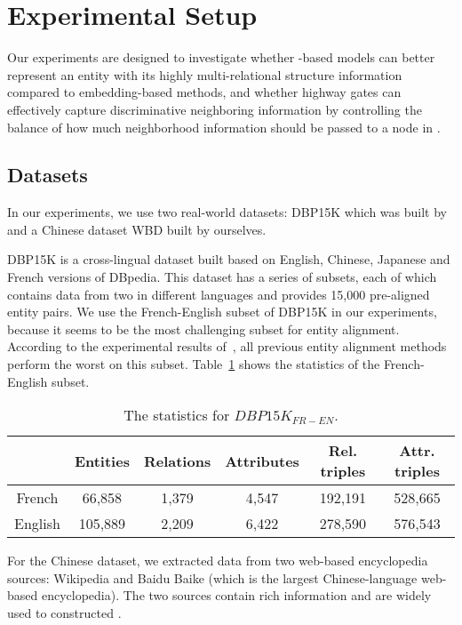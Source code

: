 \section{Experimental Setup}
	Our experiments are designed to investigate whether \RGCN-based models can better represent an entity with its highly multi-relational
structure information compared to \KG embedding-based methods, and whether highway gates can effectively capture discriminative neighboring
information by controlling the balance of how much neighborhood information should be passed to a node in \RGCN.

\subsection{Datasets}
\label{subsection:datasets}
	In our experiments, we use two real-world datasets: DBP15K which was built by~\cite{sun2017cross} and a Chinese dataset WBD built by ourselves. 
	
	DBP15K is a cross-lingual dataset built based on English, Chinese, Japanese and French versions of DBpedia. 
	This dataset has a series of subsets, each of which contains data from two \KGs in different languages and provides 15,000 pre-aligned entity pairs. 
	We use the French-English subset of DBP15K in our experiments, because it seems to be the most challenging subset for entity alignment. 
	According to the experimental results of~\cite{sun2017cross}, all previous entity alignment methods perform the worst on this subset. Table~\ref{dbp} shows the statistics of the French-English subset.
	
		\begin{table}
		\centering
		\scriptsize
		\begin{tabular}{c|ccccc}
			\toprule
			&\bf  Entities &\bf  Relations &\bf  Attributes &\bf  Rel. triples &\bf  Attr. triples \\
			\midrule
			French & 66,858 & 1,379 & 4,547 & 192,191 & 528,665 \\ 
			English & 105,889 & 2,209 & 6,422 & 278,590 & 576,543 \\
			\bottomrule
		\end{tabular}
		\caption{The statistics for $DBP15K_{FR-EN}$.}
		\label{dbp}
	\end{table}
	
    For the Chinese dataset, we extracted data from two web-based encyclopedia sources: Wikipedia and Baidu Baike (which is the largest Chinese-language web-based encyclopedia). 
    The two sources contain rich information and are widely used to constructed \KGs.
	
